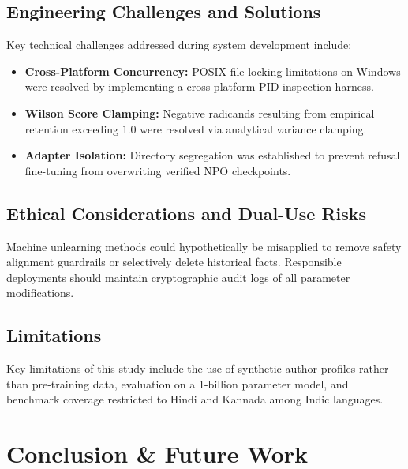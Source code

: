 \documentclass[11pt,a4paper]{article}
\begin{document}
\subsection{Engineering Challenges and Solutions}
Key technical challenges addressed during system development include:
\begin{itemize}
    \item \textbf{Cross-Platform Concurrency:} POSIX file locking limitations on Windows were resolved by implementing a cross-platform PID inspection harness.
    \item \textbf{Wilson Score Clamping:} Negative radicands resulting from empirical retention exceeding $1.0$ were resolved via analytical variance clamping.
    \item \textbf{Adapter Isolation:} Directory segregation was established to prevent refusal fine-tuning from overwriting verified NPO checkpoints.
\end{itemize}

\subsection{Ethical Considerations and Dual-Use Risks}
Machine unlearning methods could hypothetically be misapplied to remove safety alignment guardrails or selectively delete historical facts. Responsible deployments should maintain cryptographic audit logs of all parameter modifications.

\subsection{Limitations}
Key limitations of this study include the use of synthetic author profiles rather than pre-training data, evaluation on a 1-billion parameter model, and benchmark coverage restricted to Hindi and Kannada among Indic languages.

\section{Conclusion \& Future Work}
\label{sec:conclusion}
\end{document}
